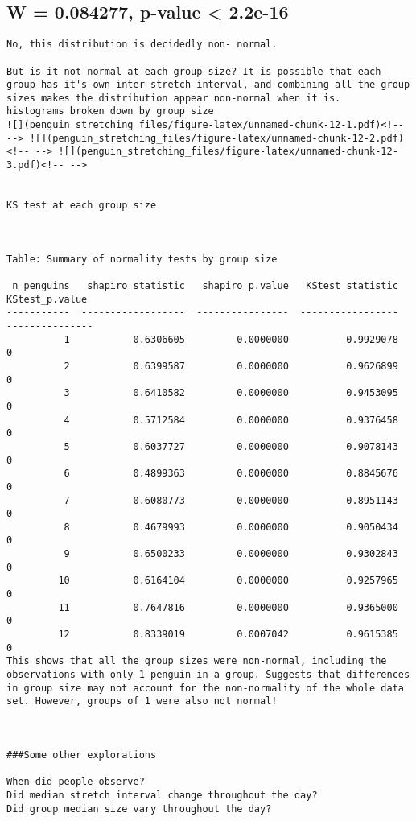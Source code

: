 \documentclass[]{article}
\begin{document}
\hypertarget{w-0.084277-p-value-2.2e-16}{%
\subsection{W = 0.084277, p-value \textless{}
2.2e-16}\label{w-0.084277-p-value-2.2e-16}}

\begin{verbatim}
No, this distribution is decidedly non- normal. 

But is it not normal at each group size? It is possible that each group has it's own inter-stretch interval, and combining all the group sizes makes the distribution appear non-normal when it is. 
histograms broken down by group size
![](penguin_stretching_files/figure-latex/unnamed-chunk-12-1.pdf)<!-- --> ![](penguin_stretching_files/figure-latex/unnamed-chunk-12-2.pdf)<!-- --> ![](penguin_stretching_files/figure-latex/unnamed-chunk-12-3.pdf)<!-- --> 


KS test at each group size



Table: Summary of normality tests by group size

 n_penguins   shapiro_statistic   shapiro_p.value   KStest_statistic   KStest_p.value
-----------  ------------------  ----------------  -----------------  ---------------
          1           0.6306605         0.0000000          0.9929078                0
          2           0.6399587         0.0000000          0.9626899                0
          3           0.6410582         0.0000000          0.9453095                0
          4           0.5712584         0.0000000          0.9376458                0
          5           0.6037727         0.0000000          0.9078143                0
          6           0.4899363         0.0000000          0.8845676                0
          7           0.6080773         0.0000000          0.8951143                0
          8           0.4679993         0.0000000          0.9050434                0
          9           0.6500233         0.0000000          0.9302843                0
         10           0.6164104         0.0000000          0.9257965                0
         11           0.7647816         0.0000000          0.9365000                0
         12           0.8339019         0.0007042          0.9615385                0
This shows that all the group sizes were non-normal, including the observations with only 1 penguin in a group. Suggests that differences in group size may not account for the non-normality of the whole data set. However, groups of 1 were also not normal! 



###Some other explorations

When did people observe?
Did median stretch interval change throughout the day?
Did group median size vary throughout the day?

\end{verbatim}
\end{document}
